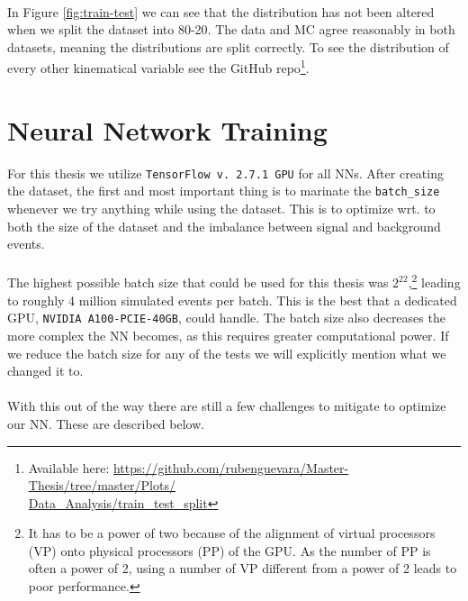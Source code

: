 \documentclass[12pt, a4paper]{book}
\begin{document}
\\In Figure \ref{fig:train-test} we can see that the distribution has not been altered when we split the dataset into 80-20. The data and MC agree reasonably in both datasets, meaning the distributions are split correctly. To see the distribution of every other kinematical variable see the GitHub repo\footnote{Available here: \href{https://github.com/rubenguevara/Master-Thesis/tree/master/Plots/Data_Analysis/train_test_split}{https://github.com/rubenguevara/Master-Thesis/tree/master/Plots/\\Data\_Analysis/train\_test\_split}}.


\clearpage
\section{Neural Network Training}\label{chap:NN_train}
For this thesis we utilize \verb|TensorFlow v. 2.7.1 GPU| for all NNs. After creating the dataset, the first and most important thing is to marinate the \verb|batch_size| whenever we try anything while using the dataset. This is to optimize wrt. to both the size 
of the dataset and the imbalance between signal and background events.\\
\\The highest possible batch size that could be used for this thesis was $2^{22}$,\footnote{It has to be a power of two because of the alignment of virtual processors (VP) onto physical processors (PP) of the GPU. As the number of PP is often a power of 2, using a number of VP different from a power of 2 leads to poor performance.} 
leading to roughly 4 million simulated events per batch. This is the best that a dedicated GPU, \verb|NVIDIA A100-PCIE-40GB|, could handle. The batch size also decreases the more complex the NN becomes, as this requires greater computational power. If we reduce the batch size for any of the tests we will explicitly mention what we changed it to.\\
\\With this out of the way there are still a few challenges to mitigate to optimize our NN. These are described below.
\end{document}
